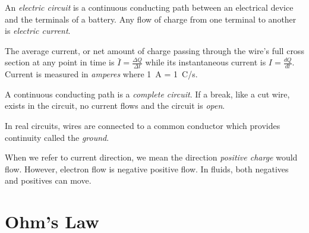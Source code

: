 \begin{definition}
    An \emph{electric circuit} is a continuous conducting path between an electrical device and the terminals of a battery. Any flow of charge from one terminal to another is \emph{electric current}.
\end{definition}
\begin{remark}
    The average current, or net amount of charge passing through the wire's full cross section at any point in time is $\bar{I} = \frac{\Delta Q}{\Delta t}$ while its instantaneous current is $I = \frac{dQ}{dt}.$ Current is measured in \emph{amperes} where \qty{1}{A} = \qty{1}{C/s}.
\end{remark}
\begin{definition}
    A continuous conducting path is a \emph{complete circuit}. If a break, like a cut wire, exists in the circuit, no current flows and the circuit is \emph{open}.
\end{definition}
\begin{definition}[Ground]
    In real circuits, wires are connected to a common conductor which provides continuity called the \emph{ground}.
\end{definition}
\begin{remark}
    When we refer to current direction, we mean the direction \emph{positive charge} would flow. However, electron flow is negative positive flow. In fluids, both negatives and positives can move.
\end{remark}

\section{Ohm's Law}

